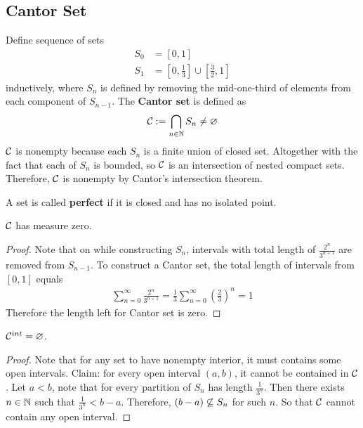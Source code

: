 \documentclass[11pt]{article}
\begin{document}
	\subsection{Cantor Set}
	\begin{definition}
		Define sequence of sets 
		\begin{align}
			S_0 &= [0, 1] \\
			S_1 &= [0, \frac{1}{3}] \cup [\frac{3}{2}, 1]
		\end{align}
		inductively, where $S_n$ is defined by removing the mid-one-third of elements from each component of $S_{n-1}$. The \textbf{Cantor set} is defined as
		\begin{align}
			\mathcal{{C}} := \bigcap_{n \in \mathbb{N}} S_n \neq \varnothing
		\end{align}
		$\mathcal{{C}}$ is nonempty because each $S_n$ is a finite union of closed set. Altogether with the fact that each of $S_n$ is bounded, so $\mathcal{{C}}$ is an intersection of nested compact sets. Therefore, $\mathcal{{C}}$ is nonempty by Cantor's intersection theorem.
	\end{definition}
	
	\begin{definition}
		A set is called \textbf{perfect} if it is closed and has no isolated point.
	\end{definition}
	
	\begin{proposition}
		$\mathcal{{C}}$ has measure zero.
	\end{proposition}
	
	\begin{proof}
		Note that on while constructing $S_n$, intervals with total length of $\frac{2^n}{3^{n+1}}$ are removed from $S_{n-1}$. To construct a Cantor set, the total length of intervals from $[0, 1]$ equals
		\begin{align}
			\sum_{n=0}^\infty \frac{2^n}{3^{n+1}} = \frac{1}{3} \sum_{n=0}^\infty \left(\frac{2}{3}\right)^n = 1
		\end{align}
		Therefore the length left for Cantor set is zero.
	\end{proof}

	\begin{proposition}
		$\mathcal{{C}}^{int} = \varnothing$.
	\end{proposition}
	
	\begin{proof}
		Note that for any set to have nonempty interior, it must contains some open intervals. Claim: for every open interval $(a, b)$, it cannot be contained in $\mathcal{{C}}$. Let $a < b$, note that for every partition of $S_n$ has length $\frac{1}{3^n}$. Then there exists $n \in \mathbb{N}$ such that $\frac{1}{3^n} < b - a$. Therefore, $(b - a) \centernot \subseteq S_n$ for such $n$. So that $\mathcal{{C}}$ cannot contain any open interval.
	\end{proof}
	
\end{document}

